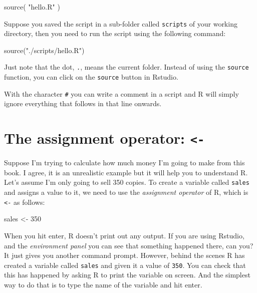 \documentclass[
  12pt,
  oneside]{book}
\newenvironment{Shaded}{\begin{snugshade}}{\end{snugshade}}
\newcommand{\DecValTok}[1]{\textcolor[rgb]{0.00,0.00,0.81}{#1}}
\newcommand{\FunctionTok}[1]{\textcolor[rgb]{0.00,0.00,0.00}{#1}}
\newcommand{\NormalTok}[1]{#1}
\newcommand{\OtherTok}[1]{\textcolor[rgb]{0.56,0.35,0.01}{#1}}
\newcommand{\StringTok}[1]{\textcolor[rgb]{0.31,0.60,0.02}{#1}}
\theoremstyle{definition}
\theoremstyle{definition}
\theoremstyle{definition}
\theoremstyle{definition}
\theoremstyle{remark}
\begin{document}
\begin{Shaded}
\begin{Highlighting}[]
\FunctionTok{source}\NormalTok{( }\StringTok{"hello.R"}\NormalTok{ )}
\end{Highlighting}
\end{Shaded}

Suppose you saved the script in a sub-folder called \texttt{scripts} of your working directory, then you need to run the script using the following command:

\begin{Shaded}
\begin{Highlighting}[]
\FunctionTok{source}\NormalTok{(}\StringTok{"./scripts/hello.R"}\NormalTok{) }
\end{Highlighting}
\end{Shaded}

Just note that the dot, \texttt{.}, means the current folder.
Instead of using the \texttt{source} function, you can click on the \texttt{source} button in Rstudio.

With the character \texttt{\#} you can write a comment in a script and R will simply ignore everything that follows in that line onwards.

\hypertarget{sec:assignmentoper}{%
\section{\texorpdfstring{The assignment operator: \texttt{\textless{}-}}{The assignment operator: \textless-}}\label{sec:assignmentoper}}

Suppose I'm trying to calculate how much money I'm going to make from this book. I agree, it is an unrealistic example but it will help you to understand R.
Let's assume I'm only going to sell 350 copies. To create a variable called \texttt{sales} and assigns a value to it, we need to use the \emph{assignment operator} of R, which is \texttt{\textless{}-} as follows:

\begin{Shaded}
\begin{Highlighting}[]
\NormalTok{sales }\OtherTok{\textless{}{-}} \DecValTok{350}
\end{Highlighting}
\end{Shaded}

When you hit enter, R doesn't print out any output. If you are using Rstudio, and the \emph{environment panel} you can see that something happened there, can you? It just gives you another command prompt. However, behind the scenes R has created a variable called \texttt{sales} and given it a value of \texttt{350}. You can check that this has happened by asking R to print the variable on screen. And the simplest way to do that is to type the name of the variable and hit enter.
\end{document}
